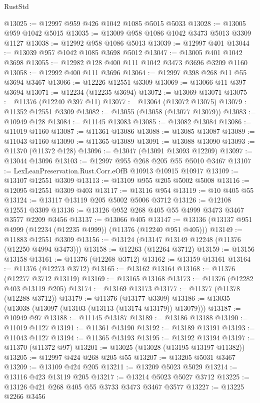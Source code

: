 \begin{lexlean}{RustStd}
\begin{coremodule}
{\begin{coremodule}
{{{{{{{{{{{{{{{{{{{{{{{{{{{{{{{{{{{{{{{{{{{{{{{{{{{{{{{{{{{{{{{{{{{{{{{{{{{{{{{{{{{{{@13025 := @12997 @959 @426 @1042 @1085 @5015 @5033
@13028 := @13005 @959 @1042 @5015
@13035 := @13009 @958 @1086 @1042 @3473 @5013 @3309 @1127
@13038 := @12992 @958 @1086 @5013
@13039 := @12997 @401
@13044 := @13039 @957 @1042 @1085 @3698 @5012
@13047 := @13005 @401 @1042 @3698
@13055 := @12982 @128 @400 @111 @1042 @3473 @3696 @3209 @1160
@13058 := @12992 @400 @111 @3696
@13064 := @12997 @398 @268 @11 @55 @3694 @3467
@13066 := @12226 @12551 @3309
@13069 := @13066 @11 @397 @3694
@13071 := @12234 (@12235 @3694)
@13072 := @13069 @13071
@13075 := @11376 (@12240 @397 @11)
@13077 := @13064 (@13072 @13075)
@13079 := @11352 @12551 @3309
@13082 := @13055 (@13058 (@13077 @13079))
@13083 := @10949 @128
@13084 := @11145 @13083
@13085 := @13082 @13084
@13086 := @11019 @1160
@13087 := @11361 @13086
@13088 := @13085 @13087
@13089 := @11043 @1160
@13090 := @11365 @13089
@13091 := @13088 @13090
@13093 := @11370 (@11372 @128)
@13096 := @13047 (@13091 @13093 @12209)
@13097 := @13044 @13096
@13103 := @12997 @955 @268 @205 @55 @5010 @3467
@13107 := LexLeanPreservation.Rust.Corr.eOfB @10913 @10915 @10917
@13109 := @13107 @12551 @3309
@13113 := @13109 @955 @205 @5002 @5008
@13116 := @12095 @12551 @3309 @403
@13117 := @13116 @954
@13119 := @10 @405 @55
@13124 := @13117 @13119 @205 @5002 @5006 @3712
@13126 := @12108 @12551 @3309
@13136 := @13126 @952 @268 @405 @55 @4999 @3473 @3467 @3577 @2209 @3456
@13137 := @13066 @405
@13147 := @13136 (@13137 @951 @4999 (@12234 (@12235 @4999)) (@11376 (@12240 @951 @405)))
@13149 := @11883 @12551 @3309
@13156 := @13124 (@13147 @13149 @12248 (@11376 (@12250 @4994 @3473)))
@13158 := @12263 (@12264 @3712)
@13159 := @13156 @13158
@13161 := @11376 (@12268 @3712)
@13162 := @13159 @13161
@13164 := @11376 (@12273 @3712)
@13165 := @13162 @13164
@13168 := @11376 (@12277 @3712 @13119)
@13169 := @13165 @13168
@13173 := @11376 (@12282 @403 @13119 @205)
@13174 := @13169 @13173
@13177 := @11377 (@11378 (@12288 @3712))
@13179 := @11376 (@13177 @3309)
@13186 := @13035 (@13038 (@13097 (@13103 (@13113 (@13174 @13179)) @13079)))
@13187 := @10949 @97
@13188 := @11145 @13187
@13189 := @13186 @13188
@13190 := @11019 @1127
@13191 := @11361 @13190
@13192 := @13189 @13191
@13193 := @11043 @1127
@13194 := @11365 @13193
@13195 := @13192 @13194
@13197 := @11370 (@11372 @97)
@13201 := @13025 (@13028 (@13195 @13197 @11382))
@13205 := @12997 @424 @268 @205 @55
@13207 := @13205 @5031 @3467
@13209 := @13109 @424 @205
@13211 := @13209 @5023 @5029
@13214 := @13116 @423 @13119 @205
@13217 := @13214 @5023 @5027 @3712
@13225 := @13126 @421 @268 @405 @55 @3733 @3473 @3467 @3577
@13227 := @13225 @2266 @3456
}}}}}}}}}}}}}}}}}}}}}}}}}}}}}}}}}}}}}}}}}}}}}}}}}}}}}}}}}}}}}}}}}}}}}}}}}}}}}}}}}}}}}
\end{coremodule}}
\end{coremodule}
\end{lexlean}
